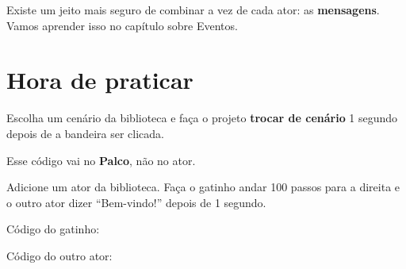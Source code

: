 \begin{codigo}
\begin{pilha}
\end{pilha}
\end{codigo}

\begin{curiosidade}
Existe um jeito mais seguro de combinar a vez de cada ator: as \textbf{mensagens}. Vamos aprender isso no capítulo sobre Eventos.
\end{curiosidade}

\section{Hora de praticar}

\begin{exercicio}
Escolha um cenário da biblioteca e faça o projeto \textbf{trocar de cenário} 1 segundo depois de a bandeira ser clicada.
\end{exercicio}

\begin{solucao}
Esse código vai no \textbf{Palco}, não no ator.
\begin{pilha}
\end{pilha}
\end{solucao}

\begin{exercicio}
Adicione um ator da biblioteca. Faça o gatinho andar 100 passos para a direita e o outro ator dizer ``Bem-vindo!'' depois de 1 segundo.
\end{exercicio}

\begin{solucao}
Código do gatinho:
\begin{pilha}
\end{pilha}
Código do outro ator:
\begin{pilha}
\end{pilha}
\end{solucao}


